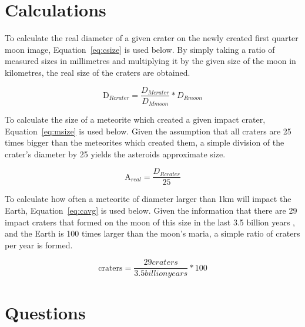 \documentclass{article}
\begin{document}

\section{Calculations}
\label{sec:calc}

To calculate the real diameter of a given crater on the newly created first quarter moon image, Equation~\ref{eq:csize}
is used below. By simply taking a ratio of measured sizes in millimetres and multiplying it by the given size
of the moon in kilometres, the real size of the craters are obtained.

\begin{equation}
\label{eq:csize}
\text{D}_{Rcrater} = \frac{D_{Mcrater}}{D_{Mmoon}} * D_{Rmoon}
\end{equation}

To calculate the size of a meteorite which created a given impact crater, Equation~\ref{eq:msize} is used below.
Given the assumption that all craters are 25 times bigger than the meteorites which created them, a simple division
of the crater's diameter by 25 yields the asteroids approximate size.

\begin{equation}
\label{eq:msize}
\text{A}_{real} = \frac{{D}_{Rcrater}}{25}
\end{equation}

To calculate how often a meteorite of diameter larger than 1km will impact the Earth, Equation~\ref{eq:cavg} is
used below. Given the information that there are 29 impact craters that formed on the moon of this size in the last
3.5 billion years , and the Earth is 100 times larger than the moon's maria, a simple ratio of craters per year is formed.

\begin{equation}
\label{eq:cavg}
\text{craters} = \frac{29 craters}{3.5 billion years} * 100
\end{equation}



\section{Questions}
\label{sec:qna}
\end{document}
